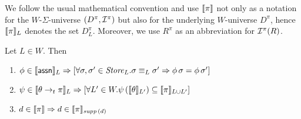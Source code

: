 \documentclass[12pt,a4paper]{report}
\begin{document}
We follow the usual mathematical convention and use $\llbracket\pi\rrbracket$ not only as a notation
for the $W$-$\Sigma$-universe $(D^\pi,\mathcal{I}^\pi)$ but also for the underlying $W$-universe $D^\pi$,
hence $\llbracket\pi\rrbracket_L$ denotes the set $D^\pi_L$. Moreover, we use $R^\pi$ as an abbreviation
for $\mathcal{I}^\pi(R)$.

\begin{lemma}
  Let $L\in W$. Then
  \begin{enumerate}
    \item $\phi\in\llbracket\mathsf{assn}\rrbracket_L \Rightarrow \left[ \forall \sigma,\sigma'\in\mathit{Store}_L.
              \sigma \equiv_L \sigma' \Rightarrow \phi\,\sigma = \phi\,\sigma'\right]$
    \item $\psi\in\llbracket\theta\rightarrow_t\pi\rrbracket_L \Rightarrow
              \left[\forall L'\in W. \psi\,(\llbracket\theta\rrbracket_{L'})\subseteq\llbracket\pi\rrbracket_{L \cup L'} \right]$
    \item $d \in \llbracket\pi\rrbracket \Rightarrow d \in \llbracket\pi\rrbracket_{\mathit{supp}\,(d)}$
  \end{enumerate}
\end{lemma}
\end{document}
